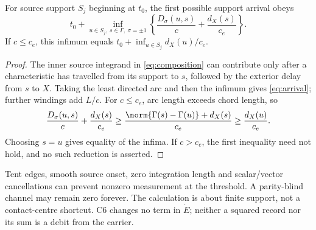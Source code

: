 \begin{proposition}\label{prop:arrival}
For source support $S_j$ beginning at $t_0$, the first possible support arrival obeys
\begin{equation}\label{eq:arrival}
 t_0+\inf_{u\in S_j,\ s\in\Gamma,\ \sigma=\pm1}
 \left\{\frac{D_\sigma(u,s)}c+\frac{d_X(s)}{c_e}\right\}.
\end{equation}
If $c\le c_e$, this infimum equals $t_0+\inf_{u\in S_j}d_X(u)/c_e$.
\end{proposition}
\begin{proof}
The inner source integrand in \eqref{eq:composition} can contribute only after a characteristic has travelled from its support to $s$, followed by the exterior delay from $s$ to $X$. Taking the least directed arc and then the infimum gives \eqref{eq:arrival}; further windings add $L/c$. For $c\le c_e$, arc length exceeds chord length, so
\[
 \frac{D_\sigma(u,s)}c+\frac{d_X(s)}{c_e}
 \ge\frac{\norm{\Gamma(s)-\Gamma(u)}+d_X(s)}{c_e}
 \ge\frac{d_X(u)}{c_e}.
\]
Choosing $s=u$ gives equality of the infima. If $c>c_e$, the first inequality need not hold, and no such reduction is asserted.
\end{proof}
Tent edges, smooth source onset, zero integration length and scalar/vector cancellations can prevent nonzero measurement at the threshold. A parity-blind channel may remain zero forever. The calculation is about finite support, not a contact-centre shortcut. C6 changes no term in $\dot E$; neither a squared record nor its sum is a debit from the carrier.
